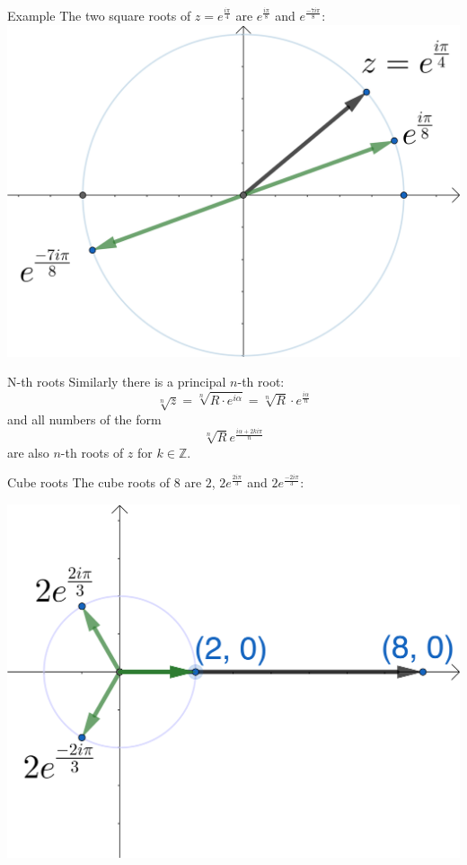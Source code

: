 \documentclass{beamer}
\begin{document}
\begin{frame}{Example}
  	The two square roots of $z = e^{\frac{i\pi}{4}}$ are $e^{\frac{i\pi}{8}}$ and $e^{\frac{-7i\pi}{8}}$:\vfill
	\includegraphics[scale=3]{roots-pi-4.png}
\end{frame}

\begin{frame}{N-th roots}
Similarly there is a principal $n$-th root:\vfill
{\LARGE
\begin{equation*}
\sqrt[n]{z} = \sqrt[n]{R\cdot e^{i\alpha}} = \sqrt[n]{R}\cdot e^{\frac{i\alpha}{n}}
\end{equation*}}\vfill
and all numbers of the form\vfill
{\LARGE
\begin{equation*}
	\sqrt[n]{R}e^{\frac{i\alpha+2ki\pi}{n}}
\end{equation*}
}\vfill
are also $n$-th roots of $z$ for $k\in \mathbb{Z}$.
\end{frame}

\begin{frame}{Cube roots}
The cube roots of $8$ are $2$, $2e^{\frac{2i\pi}{3}}$ and $2e^{\frac{-2i\pi}{3}}$:\vfill
\begin{center}
\includegraphics[scale=0.7]{cube-roots-8.png}
\end{center}
\end{frame}
\end{document}
